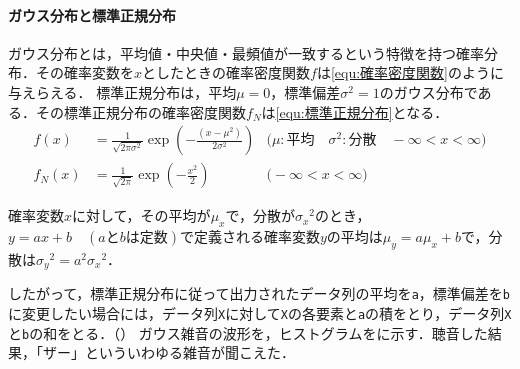 \paragraph{ガウス分布と標準正規分布}ガウス分布とは，平均値・中央値・最頻値が一致するという特徴を持つ確率分布．その確率変数を\(x\)としたときの確率密度関数\(f\)は\eqref{equ:確率密度関数}のように与えらえる．
標準正規分布は，平均\(\mu=0\)，標準偏差\(\sigma^2=1\)のガウス分布である．その標準正規分布の確率密度関数\(f_N\)は\eqref{equ:標準正規分布}となる．
\begin{align}
    f(x)   & = \frac{1}{\sqrt{2\pi\sigma^2}}\exp\left(-\frac{(x-\mu^2)}{2\sigma^2}\right) & \big(\mu:\textrm{平均}\quad\sigma^2:\textrm{分散}\quad-\infty<x<\infty\big)\label{equ:確率密度関数} \\
    f_N(x) & =\frac{1}{\sqrt{2\pi}}\exp\left(-\frac{x^2}{2}\right)                        & \big(-\infty<x<\infty\big)\label{equ:標準正規分布}
\end{align}
\begin{leftbar}
    確率変数\(x\)に対して，その平均が\(\mu_x\)で，分散が\({\sigma_x}^2\)のとき，\(y=ax+b\quad(a\textrm{と}b\textrm{は定数})\)で定義される確率変数\(y\)の平均は\(\mu_y=a\mu_x+b\)で，分散は\({\sigma_y}^2=a^2{\sigma_x}^2\)．\hfill\cite{matlab}
\end{leftbar}
したがって，標準正規分布に従って出力されたデータ列の平均を\texttt{a}，標準偏差を\texttt{b}に変更したい場合には，データ列\texttt{X}に対して\texttt{X}の各要素と\texttt{a}の積をとり，データ列\texttt{X}と\texttt{b}の和をとる．（）
\result
ガウス雑音の波形を，ヒストグラムをに示す．聴音した結果，「ザー」といういわゆる雑音が聞こえた．
